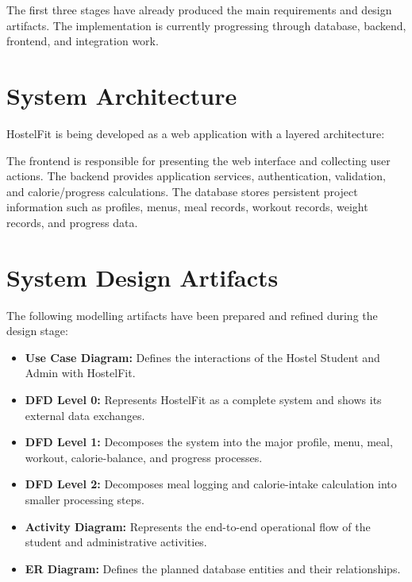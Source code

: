 \documentclass[11pt,a4paper]{article}
\begin{document}
The first three stages have already produced the main requirements and design artifacts. The implementation is currently progressing through database, backend, frontend, and integration work.

\section{System Architecture}
HostelFit is being developed as a web application with a layered architecture:

\begin{center}
\end{center}

The frontend is responsible for presenting the web interface and collecting user actions. The backend provides application services, authentication, validation, and calorie/progress calculations. The database stores persistent project information such as profiles, menus, meal records, workout records, weight records, and progress data.

\section{System Design Artifacts}
The following modelling artifacts have been prepared and refined during the design stage:
\begin{itemize}
    \item \textbf{Use Case Diagram:} Defines the interactions of the Hostel Student and Admin with HostelFit.
    \item \textbf{DFD Level 0:} Represents HostelFit as a complete system and shows its external data exchanges.
    \item \textbf{DFD Level 1:} Decomposes the system into the major profile, menu, meal, workout, calorie-balance, and progress processes.
    \item \textbf{DFD Level 2:} Decomposes meal logging and calorie-intake calculation into smaller processing steps.
    \item \textbf{Activity Diagram:} Represents the end-to-end operational flow of the student and administrative activities.
    \item \textbf{ER Diagram:} Defines the planned database entities and their relationships.
\end{itemize}
\end{document}
